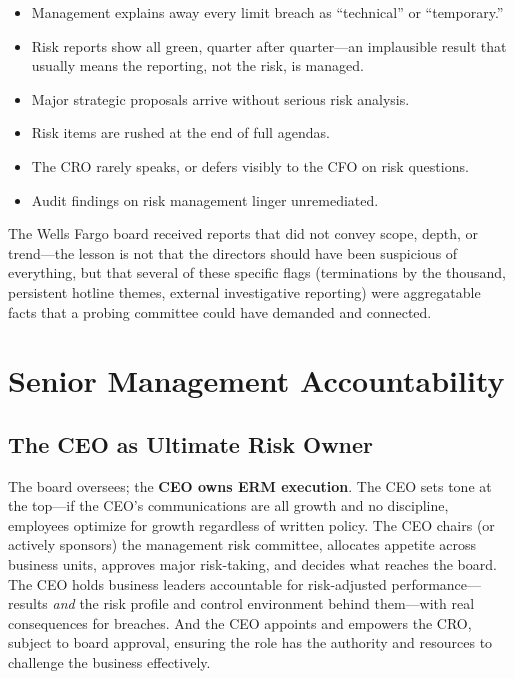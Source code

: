 \documentclass[11pt,openany]{book}
\providecommand{\tightlist}{\setlength{\itemsep}{0pt}\setlength{\parskip}{0pt}}
\begin{document}
\begin{boardroomquestion}
\begin{itemize}\tightlist
  \item Management explains away every limit breach as ``technical'' or
        ``temporary.''
  \item Risk reports show all green, quarter after quarter---an implausible
        result that usually means the reporting, not the risk, is managed.
  \item Major strategic proposals arrive without serious risk analysis.
  \item Risk items are rushed at the end of full agendas.
  \item The CRO rarely speaks, or defers visibly to the CFO on risk
        questions.
  \item Audit findings on risk management linger unremediated.
\end{itemize}
\end{boardroomquestion}

The Wells Fargo board received reports that did not convey scope, depth, or
trend---the lesson is not that the directors should have been suspicious of
everything, but that several of these specific flags (terminations by the
thousand, persistent hotline themes, external investigative reporting) were
aggregatable facts that a probing committee could have demanded and
connected.

\section{Senior Management Accountability}
\label{sec:management}

\subsection{The CEO as Ultimate Risk Owner}

The board oversees; the \textbf{CEO owns ERM execution}. The CEO sets tone at
the top---if the CEO's communications are all growth and no discipline,
employees optimize for growth regardless of written policy. The CEO chairs
(or actively sponsors) the management risk committee, allocates appetite
across business units, approves major risk-taking, and decides what reaches
the board. The CEO holds business leaders accountable for risk-adjusted
performance---results \emph{and} the risk profile and control environment
behind them---with real consequences for breaches. And the CEO appoints and
empowers the CRO, subject to board approval, ensuring the role has the
authority and resources to challenge the business effectively.
\end{document}
